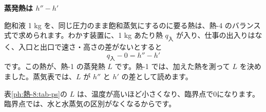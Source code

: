 \noindent\textbf{蒸発熱は $h''-h'$}\par\nobreak
飽和液 1 kg を、同じ圧力のまま飽和蒸気にするのに要る熱は、熱-4 のバランス式で求められます。わかす装置に、1 kg あたり熱 $q_{\text{入}}$ が入り、仕事の出入りはなく、入口と出口で速さ・高さの差がないとすると
\[ q_{\text{入}}-0=h''-h' \]
です。この熱が、熱-1 の蒸発熱 $L$ です。熱-1 では、加えた熱を測って $L$ を決めました。蒸気表では、$L$ が $h''$ と $h'$ の差として読めます。
\begin{phflow}
\end{phflow}
表\ref{ph:熱-8:tab-ps}の $L$ は、温度が高いほど小さくなり、臨界点で0になります。臨界点では、水と水蒸気の区別がなくなるからです。


